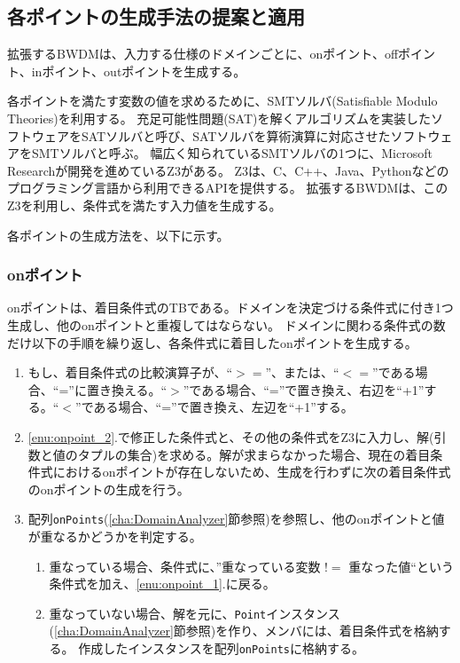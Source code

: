 \documentclass[uplatex, report, a4j, 10pt]{jsbook}
\newcommand\ttt[1]{\texttt{#1}}
\begin{document}
\subsection{各ポイントの生成手法の提案と適用}\label{cha:create_point}
拡張するBWDMは、入力する仕様のドメインごとに、onポイント、offポイント、inポイント、outポイントを生成する。

各ポイントを満たす変数の値を求めるために、SMTソルバ(Satisfiable Modulo Theories)\cite{sat}を利用する。
充足可能性問題(SAT)を解くアルゴリズムを実装したソフトウェアをSATソルバと呼び、SATソルバを算術演算に対応させたソフトウェアをSMTソルバと呼ぶ。
幅広く知られているSMTソルバの1つに、Microsoft Researchが開発を進めているZ3\cite{z3}がある。
Z3は、C、C++、Java、Pythonなどのプログラミング言語から利用できるAPIを提供する。
拡張するBWDMは、このZ3を利用し、条件式を満たす入力値を生成する。

各ポイントの生成方法を、以下に示す。

\subsubsection{onポイント}
onポイントは、着目条件式のTBである。ドメインを決定づける条件式に付き1つ生成し、他のonポイントと重複してはならない。
ドメインに関わる条件式の数だけ以下の手順を繰り返し、各条件式に着目したonポイントを生成する。
\begin{enumerate}
  \item\label{enu:onpoint_2} もし、着目条件式の比較演算子が、``$>=$''、または、``$<=$''である場合、``=''に置き換える。``$>$''である場合、``=''で置き換え、右辺を``+1''する。``$<$''である場合、``=''で置き換え、左辺を``+1''する。
  \item\label{enu:onpoint_1} \ref{enu:onpoint_2}.で修正した条件式と、その他の条件式をZ3に入力し、解(引数と値のタプルの集合)を求める。解が求まらなかった場合、現在の着目条件式におけるonポイントが存在しないため、生成を行わずに次の着目条件式のonポイントの生成を行う。
  \item 配列\ttt{onPoints}(\ref{cha:DomainAnalyzer}節参照)を参照し、他のonポイントと値が重なるかどうかを判定する。
        \begin{enumerate}
          \item 重なっている場合、条件式に、''重なっている変数 $!=$ 重なった値``という条件式を加え、\ref{enu:onpoint_1}.に戻る。
          \item 重なっていない場合、解を元に、\ttt{Point}インスタンス(\ref{cha:DomainAnalyzer}節参照)を作り、メンバ\forcusedConditionalExpression{}には、着目条件式を格納する。
                作成したインスタンスを配列\ttt{onPoints}に格納する。
        \end{enumerate}
\end{enumerate}
\end{document}
